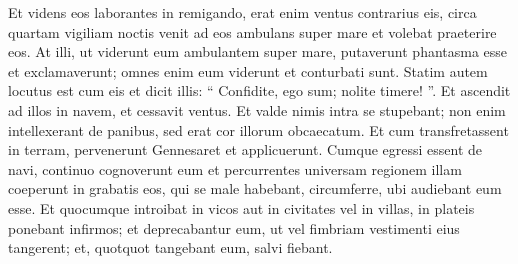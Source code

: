 \begin{biblechapter}
\begin{biblechapter}
\begin{biblechapter}
\begin{biblechapter}
\begin{biblechapter}
\begin{biblechapter}
\verse Et videns eos laborantes in remigando, erat enim ventus contrarius eis, circa quartam vigiliam noctis venit ad eos ambulans super mare et volebat praeterire eos. 
\verse At illi, ut viderunt eum ambulantem super mare, putaverunt phantasma esse et exclamaverunt; 
\verse omnes enim eum viderunt et conturbati sunt. Statim autem locutus est cum eis et dicit illis: “ Confidite, ego sum; nolite timere! ”. 
\verse Et ascendit ad illos in navem, et cessavit ventus. Et valde nimis intra se stupebant; 
\verse non enim intellexerant de panibus, sed erat cor illorum obcaecatum.
 \verse Et cum transfretassent in terram, pervenerunt Gennesaret et applicuerunt. 
 \verse Cumque egressi essent de navi, continuo cognoverunt eum 
\verse et percurrentes universam regionem illam coeperunt in grabatis eos, qui se male habebant, circumferre, ubi audiebant eum esse. 
\verse Et quocumque introibat in vicos aut in civitates vel in villas, in plateis ponebant infirmos; et deprecabantur eum, ut vel fimbriam vestimenti eius tangerent; et, quotquot tangebant eum, salvi fiebant.
 

\end{biblechapter}
\end{biblechapter}
\end{biblechapter}
\end{biblechapter}
\end{biblechapter}
\end{biblechapter}
